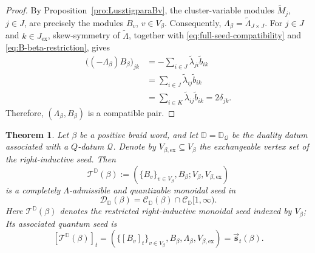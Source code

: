 \documentclass[12pt, reqno]{amsart}
\theoremstyle{plain}
\newtheorem{theorem}{Theorem}[section]
\theoremstyle{definition}
\numberwithin{equation}{section}
\newcommand{\DD}{\mathbb{D}}
\begin{document}
\begin{proof}
By Proposition~\ref{pro:LusztigparaBv}, the cluster-variable modules
\(\widetilde M_j\), \(j\in J\), are precisely the modules
\(B_v\), \(v\in V_\beta\). Consequently,
\(\Lambda_\beta=\widetilde\Lambda_{J\times J}\). For
\(j\in J\) and \(k\in J_{\mathrm{ex}}\), skew-symmetry of
\(\widetilde\Lambda\), together with
\eqref{eq:full-seed-compatibility} and
\eqref{eq:B-beta-restriction}, gives
\begin{align*}
    \bigl((-\Lambda_\beta)B_\beta\bigr)_{jk}
    &=-\sum_{i\in J}
      \widetilde\lambda_{ji}\widetilde b_{ik}\\
    &=\sum_{i\in J}
      \widetilde\lambda_{ij}\widetilde b_{ik}\\
    &=\sum_{i\in K}
      \widetilde\lambda_{ij}\widetilde b_{ik}
      =2\delta_{jk}.
\end{align*}
Therefore, \((\Lambda_\beta,B_\beta)\) is a compatible pair.
\end{proof}


\begin{theorem}\label{thm:monoidal-seed-beta}
Let \(\beta\) be a positive braid word, and let \(\DD=\DD_{\mathcal Q}\) be the duality datum associated with a \(Q\)-datum \(\mathcal Q\).
Denote by \(V_{\beta,\mathrm{ex}}\subseteq V_\beta\) the exchangeable
vertex set of the right-inductive seed. Then
\begin{equation}\label{eq:monoidal-seed-beta-definition}
    \mathcal T^{\DD}(\beta)
    :=
    \left(
        \{B_v\}_{v\in V_\beta},
        B_\beta;
        V_\beta,V_{\beta,\mathrm{ex}}
    \right)
\end{equation}
is a completely \(\Lambda\)-admissible and quantizable monoidal seed
in
\begin{equation*}
    \mathscr D_{\DD}(\beta)
    =
    \mathscr C_{\DD}(\beta)
    \cap\mathscr C_{\DD}[1,\infty).
\end{equation*}
Here \(\mathcal T^{\DD}(\beta)\) denotes the restricted
right-inductive monoidal seed indexed by \(V_\beta\);
Its associated quantum seed is
\begin{equation}\label{eq:quantum-seed-associated-Bv}
    [\mathcal T^{\DD}(\beta)]_t
    =
    \left(
        \{[B_v]_t\}_{v\in V_\beta},
        B_\beta, \Lambda_\beta,
        V_{\beta,\mathrm{ex}}
    \right)
    =
    \overrightarrow{\mathbf s}_t(\beta).
\end{equation}
\end{theorem}
\end{document}
